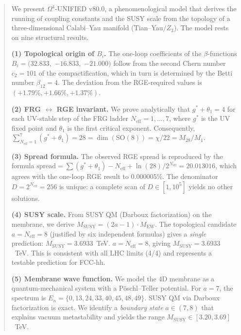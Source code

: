 \documentclass[11pt,a4paper]{article}
\theoremstyle{definition}
\begin{document}
\begin{abstract}
\noindent
We present $\Omega^4$-UNIFIED v80.0, a phenomenological model that derives
the running of coupling constants and the SUSY scale from the topology
of a three-dimensional Calabi--Yau manifold (Tian--Yau$/Z_3$).
The model rests on nine structural results.

\medskip\noindent
\textbf{(1) Topological origin of $B_i$.}
The one-loop coefficients of the $\beta$-functions
$B_i = (32.833,$ $-16.833,$ $-21.000)$ follow from the second Chern number
$c_2 = 101$ of the compactification, which in turn is determined by
the Betti number $\beta_{12} = 4$. The deviation from the RGE-required
values is $(+1.79\%, +1.66\%, +1.37\%)$.

\medskip\noindent
\textbf{(2) FRG $\leftrightarrow$ RGE invariant.}
We prove analytically that $g^* + \theta_1 = 4$ for each UV-stable
step of the FRG ladder $N_{\text{eff}} = 1, \ldots, 7$, where $g^*$ is
the UV fixed point and $\theta_1$ is the first critical exponent.
Consequently,
$\sum_{N_{\text{eff}}=1}^{7} (g^* + \theta_1) = 28
= \dim(\mathrm{SO}(8)) = \chi/22 = M_{28}/M_1$.

\medskip\noindent
\textbf{(3) Spread formula.}
The observed RGE spread is reproduced by the formula
$\text{spread} = \sum(g^*+\theta_1) - N_{\text{eff}}
+ \ln(28)/2^{N_{\text{eff}}} = 20.013016$,
which agrees with the one-loop RGE result to $0.000005\%$.
The denominator $D = 2^{N_{\text{eff}}} = 256$ is unique:
a complete scan of $D \in [1, 10^5]$ yields no other solutions.

\textbf{(4) SUSY scale.}
From SUSY QM (Darboux factorization) on the membrane, we derive
$M_{\text{SUSY}} = (2a - 1) \cdot M_{\text{EW}}$. The topological
candidate $a = N_{\text{eff}} = 8$ (justified by six independent
formulas) gives a \emph{single} prediction:
$M_{\text{SUSY}} = 3.6933$~TeV.
$a = N_{\text{eff}} = 8$, giving $M_{\text{SUSY}} = 3.6933$~TeV.
This is consistent with all LHC limits (4/4) and represents
a testable prediction for FCC-hh.

\medskip\noindent
\textbf{(5) Membrane wave function.}
We model the 4D membrane as a quantum-mechanical system with
a P\"oschl--Teller potential. For $a = 7$, the spectrum is
$E_n = \{0, 13, 24, 33, 40, 45, 48, 49\}$. SUSY QM via Darboux
factorization is exact. We identify a \emph{boundary state}
$a \in (7, 8)$ that explains vacuum metastability and yields
the range $M_{\text{SUSY}} \in [3.20, 3.69]$~TeV.


\end{abstract}
\end{document}
